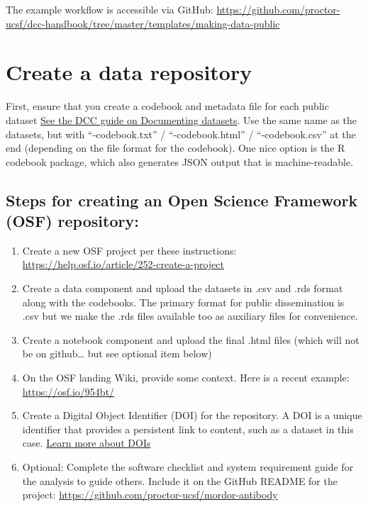 \documentclass[
]{book}
\providecommand{\tightlist}{%
  \setlength{\itemsep}{0pt}\setlength{\parskip}{0pt}}
\begin{document}
The example workflow is accessible via GitHub: \url{https://github.com/proctor-ucsf/dcc-handbook/tree/master/templates/making-data-public}

\section{Create a data repository}\label{create-a-data-repository}

First, ensure that you create a codebook and metadata file for each public dataset \href{https://proctor-ucsf.github.io/dcc-handbook/datawrangling.html#documenting-datasets}{See the DCC guide on Documenting datasets}. Use the same name as the datasets, but with ``-codebook.txt'' / ``-codebook.html'' / ``-codebook.csv'' at the end (depending on the file format for the codebook). One nice option is the R codebook package, which also generates JSON output that is machine-readable.

\subsection{Steps for creating an Open Science Framework (OSF) repository:}\label{steps-for-creating-an-open-science-framework-osf-repository}

\begin{enumerate}
\def\labelenumi{\arabic{enumi}.}
\tightlist
\item
  Create a new OSF project per these instructions: \url{https://help.osf.io/article/252-create-a-project}
\item
  Create a data component and upload the datasets in .csv and .rds format along with the codebooks. The primary format for public dissemination is .csv but we make the .rds files available too as auxiliary files for convenience.
\item
  Create a notebook component and upload the final .html files (which will not be on github\ldots{} but see optional item below)
\item
  On the OSF landing Wiki, provide some context. Here is a recent example: \url{https://osf.io/954bt/}
\item
  Create a Digital Object Identifier (DOI) for the repository. A DOI is a unique identifier that provides a persistent link to content, such as a dataset in this case. \href{https://researchdata.princeton.edu/research-lifecycle-guide/whats-doi-and-what-should-i-know-about-citing-datasets}{Learn more about DOIs}
\item
  Optional: Complete the software checklist and system requirement guide for the analysis to guide others. Include it on the GitHub README for the project: \url{https://github.com/proctor-ucsf/mordor-antibody}
\end{enumerate}
\end{document}
